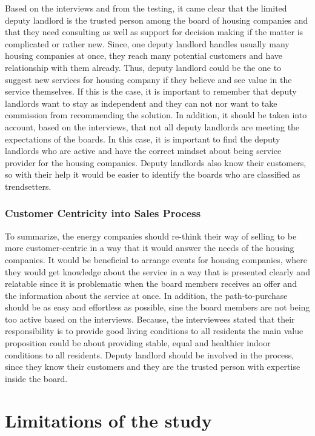 Based on the interviews and from the testing, it came clear that the limited deputy landlord is the trusted person among the board of housing companies and that they need consulting as well as support for decision making if the matter is complicated or rather new. Since, one deputy landlord handles usually many housing companies at once, they reach many potential customers and have relationship with them already. Thus, deputy landlord could be the one to suggest new services for housing company if they believe and see value in the service themselves. If this is the case, it is important to remember that deputy landlords want to stay as independent and they can not nor want to take commission from recommending the solution. In addition, it should be taken into account, based on the interviews, that not all deputy landlords are meeting the expectations of the boards. In this case, it is important to find the deputy landlords who are active and have the correct mindset about being service provider for the housing companies. Deputy landlords also know their customers, so with their help it would be easier to identify the boards who are classified as trendsetters.

\subsubsection*{Customer Centricity into Sales Process}

To summarize, the energy companies should re-think their way of selling to be more customer-centric in a way that it would answer the needs of the housing companies. It would be beneficial to arrange events for housing companies, where they would get knowledge about the service in a way that is presented clearly and relatable since it is problematic when the board members receives an offer and the information about the service at once. In addition, the path-to-purchase should be as easy and effortless as possible, sine the board members are not being too active based on the interviews. Because, the interviewees stated that their responsibility is to provide good living conditions to all residents the main value proposition could be about providing stable, equal and healthier indoor conditions to all residents. Deputy landlord should be involved in the process, since they know their customers and they are the trusted person with expertise inside the board.

\section{Limitations of the study}


